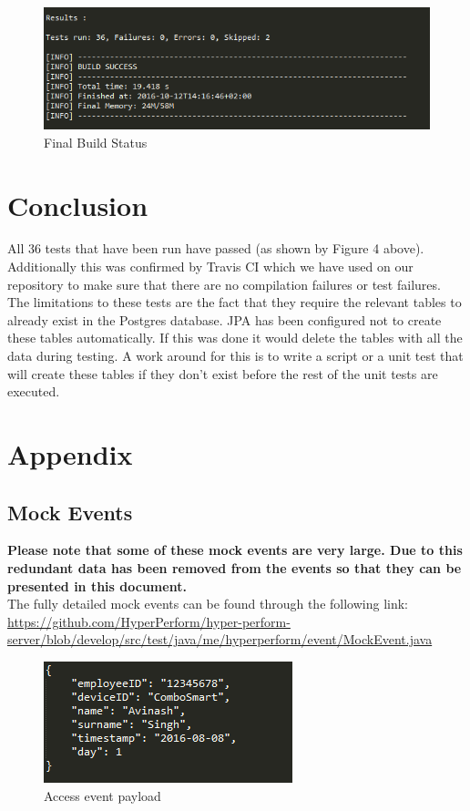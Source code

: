 \documentclass[11pt,a4paper]{article}
\begin{document}
\begin{figure}[H]
	\centering
	\includegraphics[scale=1.0]{../Images/Build_Status}
	\caption{Final Build Status}
\end{figure}

\section{Conclusion}
All 36 tests that have been run have passed (as shown by Figure 4 above). Additionally this was confirmed by Travis CI which we have used on our repository to make sure that there are no compilation failures or test failures. The limitations to these tests are the fact that they require the relevant tables to already exist in the Postgres database. JPA has been configured not to create these tables automatically. If this was done it would delete the tables with all the data during testing. A work around for this is to write a script or a unit test that will create these tables if they don't exist before the rest of the unit tests are executed.

\newpage

\section{Appendix}

\subsection{Mock Events}
\textbf{Please note that some of these mock events are very large. Due to this redundant data has been removed from the events so that they can be presented in this document.} \\

The fully detailed mock events can be found through the following link: \url{https://github.com/HyperPerform/hyper-perform-server/blob/develop/src/test/java/me/hyperperform/event/MockEvent.java} \\

\begin{figure}[H]
	\centering
	\includegraphics[scale=1.0]{../Images/accessEvent}
	\caption{Access event payload}
\end{figure}
 
\end{document}
